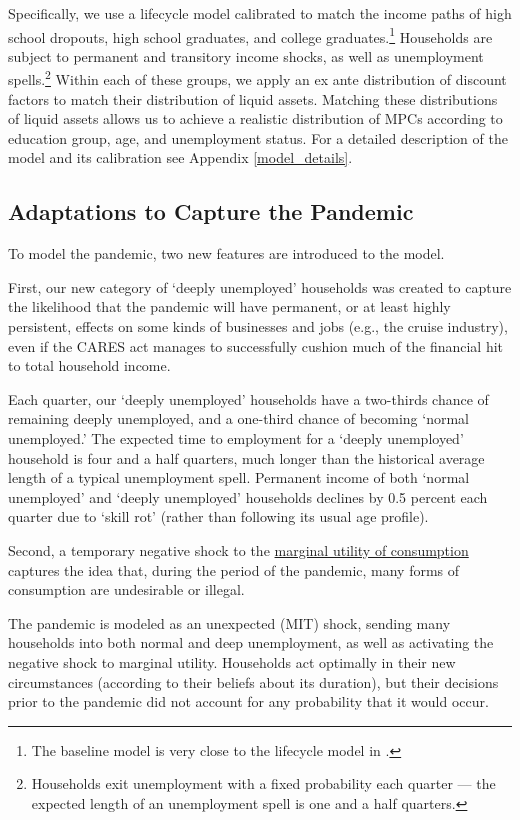 Specifically, we use a lifecycle model calibrated to match the income paths of high school dropouts, high school graduates, and college graduates.\footnote{The baseline model is very close to the lifecycle model in \cite{cstwMPC}.}
Households are subject to permanent and transitory income shocks, as well as unemployment spells.\footnote{Households exit unemployment with a fixed probability each quarter --- the expected length of an unemployment spell is one and a half quarters.}
Within each of these groups, we apply an ex ante distribution of discount factors to match their distribution of liquid assets.
Matching these distributions of liquid assets allows us to achieve a realistic distribution of MPCs according to education group, age, and unemployment status.
For a detailed description of the model and its calibration see Appendix \ref{model_details}.

\subsection{Adaptations to Capture the Pandemic}

To model the pandemic, two new features are introduced to the model.

First, our new category of `deeply unemployed' households was created to capture the likelihood that the pandemic will have permanent, or at least highly persistent, effects on some kinds of businesses and jobs (e.g., the cruise industry), even if the CARES act manages to successfully cushion much of the financial hit to total household income.

Each quarter, our `deeply unemployed' households have a two-thirds chance of remaining deeply unemployed, and a one-third chance of becoming `normal unemployed.'
The expected time to employment for a `deeply unemployed' household is four and a half quarters, much longer than the historical average length of a typical unemployment spell.
Permanent income of both `normal unemployed' and `deeply unemployed' households declines by 0.5 percent each quarter due to `skill rot' (rather than following its usual age profile).

Second, a temporary negative shock to the \href{https://www.investopedia.com/terms/m/marginalutility.asp}{marginal utility of consumption} captures the idea that, during the period of the pandemic, many forms of consumption are undesirable or illegal.

The pandemic is modeled as an unexpected (MIT) shock, sending many households into both normal and deep unemployment, as well as activating the negative shock to marginal utility.
Households act optimally in their new circumstances (according to their beliefs about its duration), but their decisions prior to the pandemic did not account for any probability that it would occur.

